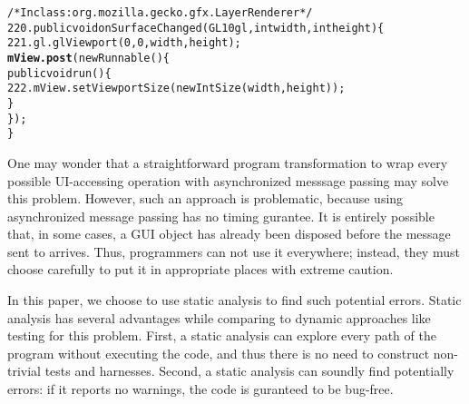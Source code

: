 \begin{CodeOut}
\begin{alltt}
     /* In class: org.mozilla.gecko.gfx.LayerRenderer */
220. public void onSurfaceChanged(GL10 gl, int width, int height) \{
221.     gl.glViewport(0, 0, width, height);
         \textbf{mView.post}(new Runnable() \{
             public void run() \{
222.             mView.setViewportSize(new IntSize(width, height));
             \}
         \});
     \}
\end{alltt}
\end{CodeOut}

One may wonder that a straightforward program transformation to wrap
every possible UI-accessing operation with asynchronized messsage passing
may solve this problem. However, such an approach is problematic,
because using asynchronized message passing has no timing
gurantee. It is entirely possible that, in some cases, a GUI object has already been
disposed before the message sent to arrives. Thus, programmers can not use
it everywhere; instead, they must choose carefully to put it in appropriate places
with extreme caution.


In this paper, we choose to use static analysis to find such potential errors.
Static analysis has several advantages while comparing to dynamic approaches like testing for this problem.
First, a static analysis can explore every path of the program without executing the code, and
thus there is no need to construct non-trivial tests and harnesses.
Second, a static analysis can soundly find potentially errors: if it
reports no warnings, the code is guranteed to be bug-free. 


